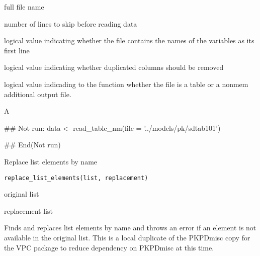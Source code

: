 \documentclass[letterpaper]{book}
\begin{document}
%
\begin{Arguments}
\begin{ldescription}
\item[\code{file}] full file name

\item[\code{skip}] number of lines to skip before reading data

\item[\code{header}] logical value indicating whether the file contains the names
of the variables as its first line

\item[\code{rm\_duplicates}] logical value indicating whether duplicated columns should be removed

\item[\code{nonmem\_tab}] logical value indicading to the function whether the file is a
table or a nonmem additional output file.
\end{ldescription}
\end{Arguments}
%
\begin{Value}
A 
\end{Value}
%
\begin{Examples}
\begin{ExampleCode}
## Not run: 
data <- read_table_nm(file = '../models/pk/sdtab101')

## End(Not run)
\end{ExampleCode}
\end{Examples}
%
\begin{Description}\relax
Replace list elements by name
\end{Description}
%
\begin{Usage}
\begin{verbatim}
replace_list_elements(list, replacement)
\end{verbatim}
\end{Usage}
%
\begin{Arguments}
\begin{ldescription}
\item[\code{list}] original list

\item[\code{replacement}] replacement list
\end{ldescription}
\end{Arguments}
%
\begin{Details}\relax
Finds and replaces list elements by name and throws an error if an 
element is not available in the original list. This is a local duplicate
of the PKPDmisc copy for the VPC package to reduce dependency on PKPDmisc
at this time.
\end{Details}
\end{document}
